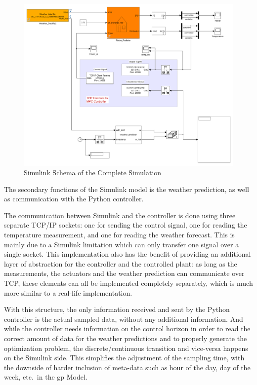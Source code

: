 \begin{figure}[ht]
    \centering
    \includegraphics[width = \textwidth]{Images/polydome_python.pdf}
    \caption{Simulink Schema of the Complete Simulation}
    \label{fig:Simulink_complete}
\end{figure}

The secondary functions of the Simulink model is the weather prediction, as well
as communication with the Python controller.

The communication between Simulink and the controller is done using three
separate TCP/IP sockets: one for sending the control signal, one for reading the
temperature measurement, and one for reading the weather forecast. This is
mainly due to a Simulink limitation which can only transfer one signal over a
single socket. This implementation also has the benefit of providing an
additional layer of abstraction for the controller and the controlled plant: as
long as the measurements, the actuators and the weather prediction can
communicate over TCP, these elements can all be implemented completely
separately, which is much more similar to a real-life implementation.

With this structure, the only information received and sent by the Python
controller is the actual sampled data, without any additional information. And
while the controller needs information on the control horizon in order to read
the correct amount of data for the weather predictions and to properly generate
the optimization problem, the discrete/continuous transition and vice-versa
happens on the Simulink side. This simplifies the adjustment of the sampling
time, with the downside of harder inclusion of meta-data such as hour of the
day, day of the week, etc.\ in the \acrlong{gp} Model.

